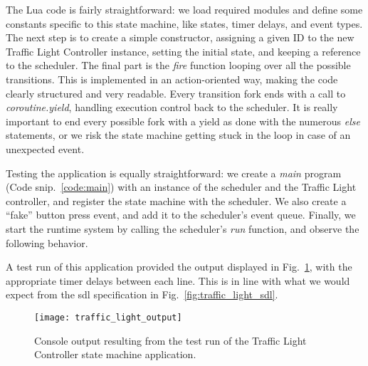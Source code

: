 \noindent
The Lua code is fairly straightforward: we load required modules and define some constants specific to this state machine, like states, timer delays, and event types. The next step is to create a simple constructor, assigning a given ID to the new Traffic Light Controller instance, setting the initial state, and keeping a reference to the scheduler. The final part is the \emph{fire} function looping over all the possible transitions. This is implemented in an action-oriented way, making the code clearly structured and very readable. Every transition fork ends with a call to \emph{coroutine.yield}, handling execution control back to the scheduler. It is really important to end every possible fork with a yield as done with the numerous \emph{else} statements, or we risk the state machine getting stuck in the loop in case of an unexpected event.

\noindent
Testing the application is equally straightforward: we create a \emph{main} program (Code snip.~\ref{code:main}) with an instance of the scheduler and the Traffic Light controller, and register the state machine with the scheduler. We also create a ``fake'' button press event, and add it to the scheduler's event queue. Finally, we start the runtime system by calling the scheduler's \emph{run} function, and observe the following behavior.

\noindent
A test run of this application provided the output displayed in Fig.~\ref{fig:traffic_light_output}, with the appropriate timer delays between each line. This is in line with what we would expect from the \gls{sdl} specification in Fig.~\ref{fig:traffic_light_sdl}.

\begin{figure}[htp]
	\centering
	\texttt{[image: traffic\_light\_output]}
	\caption[Output of Traffic Light Controller test run (desktop)]{Console output resulting from the test run of the Traffic Light Controller state machine application.}
	\label{fig:traffic_light_output}
\end{figure}

